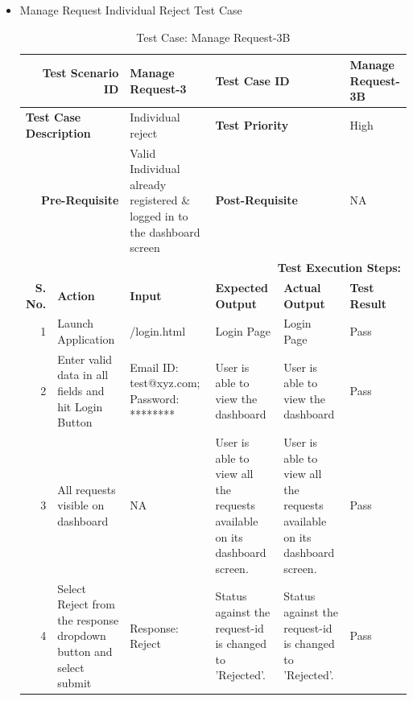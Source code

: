 \documentclass[a4paper, hidelinks, 12pt]{report}
\begin{document}
\begin{itemize}
\begin{table}[H]
\begin{tabular}{|r|p{4.355em}|p{7.715em}|p{6.43em}|p{5.855em}|p{5.07em}|}
    \bottomrule
    \end{tabular}%
  \label{tab:Test Case: Manage Request-3A}%
\end{table}%
\item{Manage Request Individual Reject Test Case}
\begin{table}[H]
  \centering
  \caption{Test Case: Manage Request-3B}
    \begin{tabular}{|r|p{4.355em}|p{7.715em}|p{6.43em}|p{5.855em}|p{5.07em}|}
    \toprule
    \multicolumn{2}{|p{13.425em}|}{\textbf{Test Scenario ID}} & Manage Request-3 & \multicolumn{2}{p{12.285em}|}{\textbf{Test Case ID}} & Manage Request-3B \\
    \midrule
    \multicolumn{2}{|l|}{\multirow{2}[2]{*}{\textbf{Test Case Description}}} & \multirow{2}[2]{*}{Individual reject} & \multicolumn{2}{l|}{\multirow{2}[2]{*}{\textbf{Test Priority}}} & \multirow{2}[2]{*}{High} \\
    \multicolumn{2}{|l|}{} & \multicolumn{1}{l|}{} & \multicolumn{2}{l|}{} & \multicolumn{1}{l|}{} \\
    \midrule
    \multicolumn{2}{|p{13.425em}|}{\textbf{Pre-Requisite}} & Valid Individual already registered \& logged in to the dashboard screen & \multicolumn{2}{p{12.285em}|}{\textbf{Post-Requisite}} & NA \\
    \midrule
    \multicolumn{6}{p{38.495em}|}{\textbf{Test Execution Steps:}} \\
    \midrule
    \multicolumn{1}{|p{5.07em}|}{\textbf{S. No.}} & \textbf{Action } & \textbf{Input} & \textbf{Expected Output} & \textbf{Actual Output} & \textbf{Test Result} \\
    \midrule
    1     & Launch Application & /login.html & Login Page & Login Page & Pass \\
    \midrule
    2     & Enter valid data in all fields and hit Login Button & Email ID: test@xyz.com; Password: ******** & User is able to view the dashboard & User is able to view the dashboard & Pass \\
    \midrule
    3     & All requests visible on dashboard & NA    & User is able to view all the requests available on its dashboard screen. & User is able to view all the requests available on its dashboard screen. & Pass \\
    \midrule
    4     & Select Reject from the response dropdown button and select submit & Response: Reject & Status against the request-id is changed to 'Rejected'. & Status against the request-id is changed to 'Rejected'. & Pass \\

\end{tabular}
\end{table}
\end{itemize}
\end{document}
